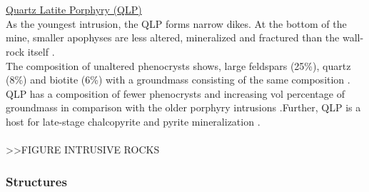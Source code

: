 \documentclass[a4paper,11pt,titlepage]{article}
\begin{document}
\\
\\\underline{Quartz Latite Porphyry (QLP)}
\\ As the youngest intrusion, the QLP forms narrow dikes. At the bottom of the mine, smaller apophyses are less altered, mineralized and fractured than the wall-rock itself \citep{Lanier1978,Stringham1953}. 
\\ The composition of unaltered phenocrysts shows, large feldspars (25\%), quartz (8\%) and biotite (6\%) with a groundmass consisting of the same composition \citep{Lanier1978}. QLP has a composition of fewer phenocrysts and increasing vol percentage of groundmass in comparison with the older porphyry intrusions \citep{Redmond2010a}.Further, QLP is a host for late-stage chalcopyrite and pyrite mineralization \citep{Babcock1995}. 
\\
\\>>FIGURE INTRUSIVE ROCKS

\subsubsection{Structures}
\end{document}
